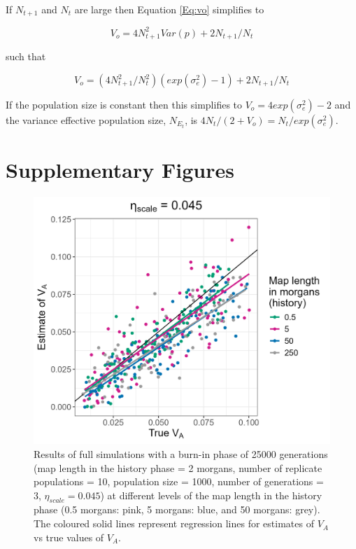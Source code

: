 \documentclass[12pt]{article}
\begin{document}
\begin{bibunit}
If $N_{t+1}$ and $N_t$ are large then Equation \ref{Eq:vo} simplifies to

\begin{equation}
V_o = 4N^2_{t+1}Var(p)+2N_{t+1}/N_t
\end{equation}

such that 

\begin{equation}
V_o = (4N^2_{t+1}/N^2_t)(exp(\sigma^2_e)-1)+2N_{t+1}/N_t
\end{equation}

If the population size is constant then this simplifies to $V_o = 4exp(\sigma^2_e)-2$ and the variance effective population size, $N_{E_t}$, is $4N_t/(2+V_o)=N_t/exp(\sigma^2_e)$. 

\section{Supplementary Figures}

\begin{figure}[H]
\centering
\includegraphics[scale = 0.15]{Figures/FigS1.jpg}
\caption{Results of full simulations with a burn-in phase of 25000 generations (map length in the history phase = 2 morgans, number of replicate populations = 10, population size = 1000, number of generations = 3, $\eta_{scale} = 0.045$) at different levels of the map length in the history phase (0.5 morgans: pink, 5 morgans: blue, and 50 morgans: grey). The coloured solid lines represent regression lines for estimates of $V_A$ vs true values of $V_A$.}
  \label{fig:Figure S1}
\end{figure}



\end{bibunit}
\end{document}
